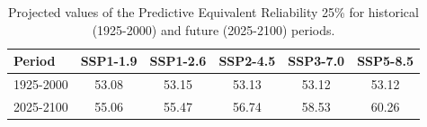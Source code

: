\begin{table}[htbp]
\centering
\begin{tabular}{lccccc}
\toprule
Period & \textbf{SSP1-1.9} & \textbf{SSP1-2.6} & \textbf{SSP2-4.5} & \textbf{SSP3-7.0} & \textbf{SSP5-8.5} \\
\midrule
1925-2000 & 53.08 & 53.15 & 53.13 & 53.12 & 53.12 \\
2025-2100 & 55.06 & 55.47 & 56.74 & 58.53 & 60.26 \\
\bottomrule
\end{tabular}
\caption{Projected values of the Predictive Equivalent Reliability 25\% for historical (1925-2000) and future (2025-2100) periods.}
\label{tab:pred_scenarios_4per}
\end{table}